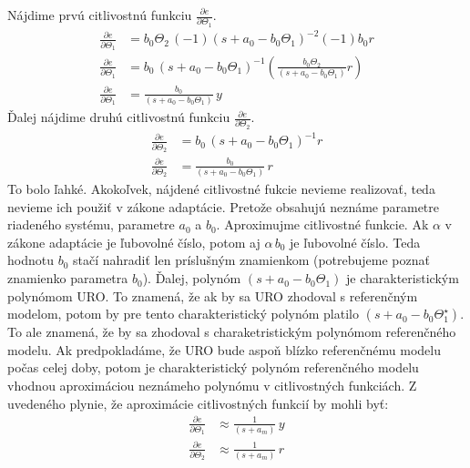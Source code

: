 \documentclass[a4paper, 10pt, ]{article}
\begin{document}
Nájdime prvú citlivostnú funkciu $\frac{\partial e}{\partial \Theta_1}$.
\begin{subequations}
    \begin{align}
        \frac{\partial e}{\partial \Theta_1} &= b_0 \Theta_2 \, (-1)\left( s + a_0 - b_0 \Theta_1 \right)^{-2} (-1) b_0 r \\
        \frac{\partial e}{\partial \Theta_1} &= b_0\, \left( s + a_0 - b_0 \Theta_1 \right)^{-1} \left( \frac{b_0 \Theta_2}{\left( s + a_0 - b_0 \Theta_1 \right)} r \right) \\
        \frac{\partial e}{\partial \Theta_1} &=  \frac{b_0}{\left( s + a_0 - b_0 \Theta_1 \right)}\, y
    \end{align}
\end{subequations}
Ďalej nájdime druhú citlivostnú funkciu $\frac{\partial e}{\partial \Theta_2}$.
\begin{subequations}
    \begin{align}
        \frac{\partial e}{\partial \Theta_2} &= b_0 \, \left( s + a_0 - b_0 \Theta_1 \right)^{-1} r \\
        \frac{\partial e}{\partial \Theta_2} &=  \frac{b_0}{\left( s + a_0 - b_0 \Theta_1 \right)}\, r
    \end{align}
\end{subequations}
To bolo ľahké. Akokoľvek, nájdené citlivostné fukcie nevieme realizovať, teda nevieme ich použiť v zákone adaptácie. Pretože obsahujú neznáme parametre riadeného systému, parametre $a_0$ a $b_0$. Aproximujme citlivostné funkcie. Ak $\alpha$ v zákone adaptácie je ľubovolné číslo, potom aj $\alpha\, b_0$ je ľubovolné číslo. Teda hodnotu $b_0$ stačí nahradiť len príslušným znamienkom (potrebujeme poznať znamienko parametra $b_0$). Ďalej, polynóm $\left( s + a_0 - b_0 \Theta_1 \right)$ je charakteristickým polynómom URO. To znamená, že ak by sa URO zhodoval s referenčným modelom, potom by pre tento charakteristický polynóm platilo $\left( s + a_0 - b_0 \Theta_1^\star \right)$. To ale znamená, že by sa zhodoval s charaketristickým polynómom referenčného modelu. Ak predpokladáme, že URO bude aspoň blízko referenčnému modelu počas celej doby, potom je charakteristický polynóm referenčného modelu vhodnou aproximáciou neznámeho polynómu v citlivostných funkciách. Z uvedeného plynie, že aproximácie citlivostných funkcií by mohli byť:
\begin{subequations}
    \begin{align}
        \frac{\partial e}{\partial \Theta_1} &\approx  \frac{1}{\left( s + a_m \right)}\, y \\
        \frac{\partial e}{\partial \Theta_2} &\approx  \frac{1}{\left( s + a_m \right)}\, r
    \end{align}
\end{subequations}
\end{document}
